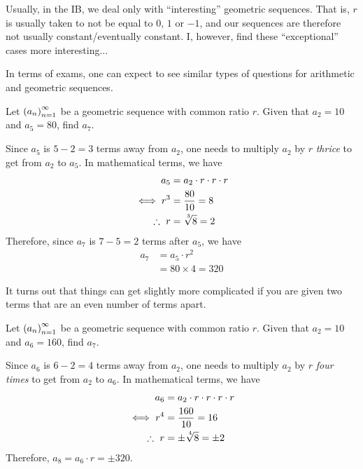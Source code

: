 \begin{remark}
    Usually, in the IB, we deal only with ``interesting'' geometric sequences. That is, $r$ is usually taken to not be equal to $0$, $1$ or $-1$, and our sequences are therefore not usually constant/eventually constant. I, however, find these ``exceptional'' cases more interesting...
\end{remark}

In terms of exams, one can expect to see similar types of questions for arithmetic and geometric sequences.
\begin{boxexample}
    Let $\left( a_n \right)_{n=1}^{\infty}$ be a geometric sequence with common ratio $r$. Given that $a_2 = 10$ and $a_5 = 80$, find $a_7$.
    \begin{solution}
        Since $a_5$ is $5 - 2 = 3$ terms away from $a_2$, one needs to multiply $a_2$ by $r$ \textit{thrice} to get from $a_2$ to $a_5$. In mathematical terms, we have
        \begin{align*}
            a_5 &= a_2 \cdot r \cdot r \cdot r \\
            \iff r^3 &= \frac{80}{10} = 8 \\
            \ergo \ r &= \cbrt{8} = 2
        \end{align*}
        Therefore, since $a_7$ is $7 - 5 = 2$ terms after $a_5$, we have
        \begin{align*}
            a_7 &= a_5 \cdot r^2 \\
            &= 80 \times 4 = 320
        \end{align*}
        \vspace{-2em}
    \end{solution}
\end{boxexample}

It turns out that things can get slightly more complicated if you are given two terms that are an even number of terms apart.

\begin{boxexample}
    Let $\left( a_n \right)_{n=1}^{\infty}$ be a geometric sequence with common ratio $r$. Given that $a_2 = 10$ and $a_6 = 160$, find $a_7$.
    \begin{solution}
        Since $a_6$ is $6 - 2 = 4$ terms away from $a_2$, one needs to multiply $a_2$ by $r$ \textit{four times} to get from $a_2$ to $a_6$. In mathematical terms, we have
        \begin{align*}
            a_6 &= a_2 \cdot r \cdot r \cdot r \cdot r \\
            \iff r^4 &= \frac{160}{10} = 16 \\
            \ergo \ r &= \pm \nthroot{4}{8} = \pm 2
        \end{align*}
        Therefore, $a_8 = a_6 \cdot r = \pm 320$.
    \end{solution}
\end{boxexample}

